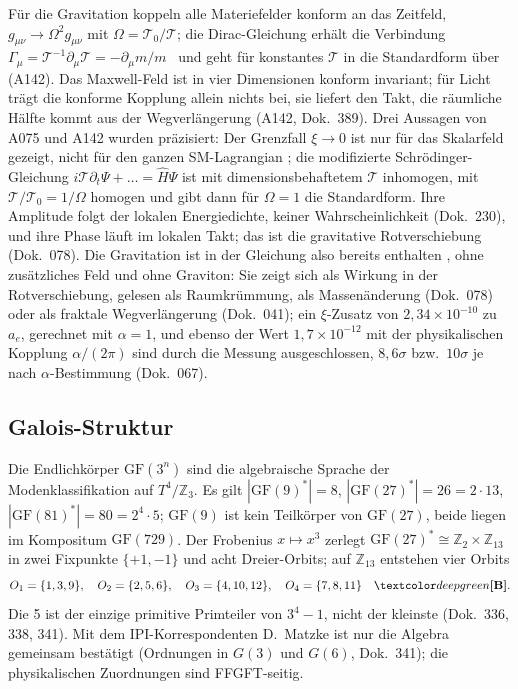 Für die Gravitation koppeln alle Materiefelder konform an das Zeitfeld, $g_{\mu\nu}\to
\Omega^2g_{\mu\nu}$ mit $\Omega=\mathcal T_0/\mathcal T$; die Dirac-Gleichung erhält die Verbindung
$\Gamma_\mu=\mathcal T^{-1}\partial_\mu\mathcal T=-\partial_\mu m/m$ \KM\ und geht für konstantes
$\mathcal T$ in die Standardform über (A142). Das Maxwell-Feld ist in vier Dimensionen konform
invariant; für Licht trägt die konforme Kopplung allein nichts bei, sie liefert den Takt, die
räumliche Hälfte kommt aus der Wegverlängerung (A142, Dok.~389). Drei Aussagen von A075 und A142 wurden präzisiert: Der Grenzfall $\xi\to0$ ist nur für das Skalarfeld gezeigt, nicht für
den ganzen SM-Lagrangian \SM; die modifizierte Schrödinger-Gleichung $i\mathcal
T\partial_t\Psi+\ldots=\hat H\Psi$ ist mit dimensionsbehaftetem $\mathcal T$ inhomogen, mit
$\mathcal T/\mathcal T_0=1/\Omega$ homogen und gibt dann für $\Omega=1$ die Standardform. Ihre
Amplitude folgt der lokalen Energiedichte, keiner Wahrscheinlichkeit (Dok.~230), und ihre Phase
läuft im lokalen Takt; das ist die gravitative Rotverschiebung (Dok.~078). Die Gravitation ist
in der Gleichung also bereits enthalten \BM\KM, ohne zusätzliches Feld und ohne Graviton: Sie
zeigt sich als Wirkung in der Rotverschiebung, gelesen als Raumkrümmung, als Massenänderung
(Dok.~078) oder als fraktale Wegverlängerung (Dok.~041); ein $\xi$-Zusatz von $2{,}34\times10^{-10}$ zu $a_e$, gerechnet mit $\alpha=1$, und ebenso
der Wert $1{,}7\times10^{-12}$ mit der physikalischen Kopplung $\alpha/(2\pi)$ sind durch die
Messung ausgeschlossen, $8{,}6\sigma$ bzw.\ $10\sigma$ je nach $\alpha$-Bestimmung (Dok.~067).

\subsection{Galois-Struktur}

Die Endlichkörper $\mathrm{GF}(3^n)$ sind die algebraische Sprache der Modenklassifikation
auf $T^4/\mathbb Z_3$. Es gilt $|\mathrm{GF}(9)^*|=8$, $|\mathrm{GF}(27)^*|=26=2\cdot13$,
$|\mathrm{GF}(81)^*|=80=2^4\cdot5$; $\mathrm{GF}(9)$ ist kein Teilkörper von $\mathrm{GF}(27)$,
beide liegen im Kompositum $\mathrm{GF}(729)$. Der Frobenius $x\mapsto x^3$ zerlegt
$\mathrm{GF}(27)^*\cong\mathbb Z_2\times\mathbb Z_{13}$ in zwei Fixpunkte $\{+1,-1\}$ und acht
Dreier-Orbits; auf $\mathbb Z_{13}$ entstehen vier Orbits
\begin{equation}
  O_1=\{1,3,9\},\quad O_2=\{2,5,6\},\quad O_3=\{4,10,12\},\quad O_4=\{7,8,11\}\quad\BM .
\end{equation}
Die 5 ist der einzige primitive Primteiler von $3^4-1$, nicht der kleinste (Dok.~336, 338, 341).
Mit dem IPI-Korrespondenten D.~Matzke ist nur die Algebra gemeinsam bestätigt (Ordnungen in
$G(3)$ und $G(6)$, Dok.~341); die physikalischen Zuordnungen sind FFGFT-seitig.

